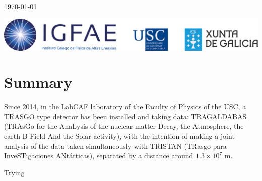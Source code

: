 \documentclass{book}
\begin{document}
\begin{titlepage}
	\vfill


	{\large \today\par}
\end{titlepage}


\thispagestyle{empty}
\vfill
\includegraphics[scale=0.25]{LogoIGFAE}


\tableofcontents

\chapter*{Summary}

\hspace{13pt} Since 2014, in the LabCAF laboratory of the Faculty of Physics of the USC, a TRASGO type detector has been installed and taking data: TRAGALDABAS (TRAsGo for the AnaLysis of the nuclear matter Decay, the Atmosphere, the earth B-Field And the Solar activity), with the intention of making a joint analysis of the data taken simultaneously with TRISTAN (TRasgo para InveSTigaciones ANtárticas), separated by a distance around $1.3 \times 10^7$ m.

Trying
\end{document}
